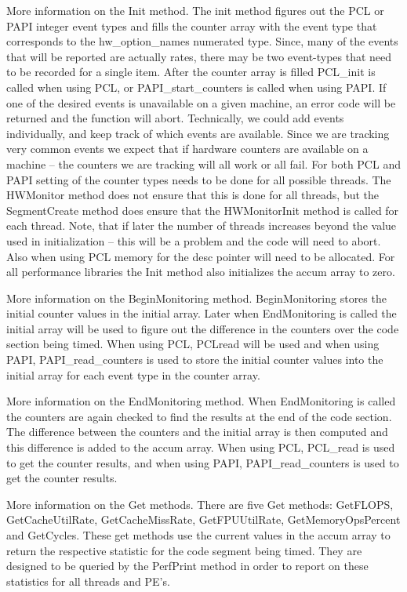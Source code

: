 More information on the Init method. The init method figures out the PCL or
PAPI integer event types and fills the counter array with the event type that
corresponds to the hw\_option\_names numerated type. Since, many of the events
that will be reported are actually rates, there may be two event-types that
need to be recorded for a single item. After the counter array is filled PCL\_init
is called when using PCL, or PAPI\_start\_counters is called when using PAPI.
If one of the desired events is unavailable on a given machine, an error
code will be returned and the function will abort. Technically, we could
add events individually, and keep track of which events are available. Since
we are tracking very common events we expect that if hardware counters are
available on a machine -- the counters we are tracking will all work or all fail.
For both PCL and PAPI setting of the counter types needs to be done for
all possible threads. The HWMonitor method does not ensure that this is done
for all threads, but the SegmentCreate method does ensure that the HWMonitorInit
method is called for each thread.  Note, that if later
the number of threads increases beyond the value used in initialization -- this
will be a problem and the code will need to abort. Also when using PCL memory
for the desc pointer will need to be allocated. For all performance libraries the 
Init method also initializes the accum array to zero.

More information on the BeginMonitoring method. BeginMonitoring stores the initial
counter values in the initial array. Later when EndMonitoring is called the initial
array will be used to figure out the difference in the counters over the code 
section being timed. When using PCL, PCLread will be used and when using PAPI, 
PAPI\_read\_counters is used to store the initial counter values into the initial array 
for each event type in the counter array.

More information on the EndMonitoring method. When EndMonitoring is called
the counters are again checked to find the results at the end of the code
section. The difference between the counters and the initial array is then
computed and this difference is added to the accum array. When using PCL,
PCL\_read is used to get the counter results, and when using PAPI, PAPI\_read\_counters
is used to get the counter results.

More information on the Get methods. There are five Get methods: GetFLOPS, GetCacheUtilRate,
GetCacheMissRate, GetFPUUtilRate, GetMemoryOpsPercent and GetCycles. These get methods use 
the current values in the accum array to return the respective statistic for the code 
segment being timed.  They are designed to be queried by the PerfPrint method in 
order to report on these statistics for all threads and PE's.

